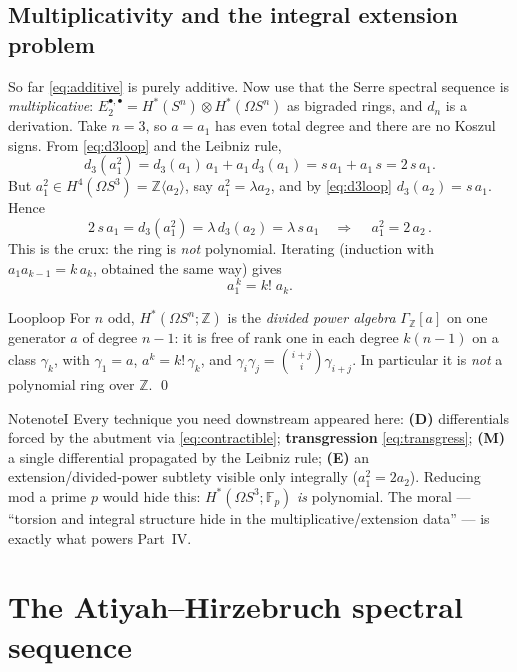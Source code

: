 \documentclass{article}
\newcommand{\F}{{\mathbb{F}}}
\newcommand{\Z}{{\mathbb{Z}}}
\begin{document}
\subsection{Multiplicativity and the integral extension problem}

So far \eqref{eq:additive} is purely additive. Now use that the Serre spectral
sequence is \emph{multiplicative}: $E_2^{\bullet,\bullet}=H^*(S^n)\otimes
H^*(\Omega S^n)$ as bigraded rings, and $d_n$ is a derivation. Take $n=3$, so
$a=a_1$ has even total degree and there are no Koszul signs. From
\eqref{eq:d3loop} and the Leibniz rule,
\[
  d_3(a_1^2)=d_3(a_1)\,a_1+a_1\,d_3(a_1)=s\,a_1+a_1\,s=2\,s\,a_1 .
\]
But $a_1^2\in H^4(\Omega S^3)=\Z\langle a_2\rangle$, say $a_1^2=\lambda a_2$, and
by \eqref{eq:d3loop} $d_3(a_2)=s\,a_1$. Hence
\[
  2\,s\,a_1=d_3(a_1^2)=\lambda\,d_3(a_2)=\lambda\,s\,a_1
  \quad\Longrightarrow\quad \boxed{\,a_1^2=2\,a_2\,}.
\]
This is the crux: the ring is \emph{not} polynomial. Iterating (induction with
$a_1a_{k-1}=k\,a_k$, obtained the same way) gives
\[
  a_1^{\,k}=k!\;a_k .
\]

\begin{thm}{Loop}{loop}
For $n$ odd, $H^*(\Omega S^n;\Z)$ is the \emph{divided power algebra}
$\Gamma_\Z[a]$ on one generator $a$ of degree $n-1$: it is free of rank one in
each degree $k(n-1)$ on a class $\gamma_k$, with $\gamma_1=a$,
$a^{k}=k!\,\gamma_k$, and $\gamma_i\gamma_j=\binom{i+j}{i}\gamma_{i+j}$. In
particular it is \emph{not} a polynomial ring over $\Z$. \qed
\end{thm}

\begin{titledBox}{Note}{noteI}
Every technique you need downstream appeared here:
\textbf{(D)} differentials forced by the abutment via \eqref{eq:contractible};
\textbf{transgression} \eqref{eq:transgress};
\textbf{(M)} a single differential propagated by the Leibniz rule;
\textbf{(E)} an extension/divided‑power subtlety visible only integrally
($a_1^2=2a_2$). Reducing mod a prime $p$ would hide this: $H^*(\Omega S^3;\F_p)$
\emph{is} polynomial. The moral --- ``torsion and integral structure hide in the
multiplicative/extension data'' --- is exactly what powers Part~IV.
\end{titledBox}

\section{The Atiyah--Hirzebruch spectral sequence}
\end{document}
